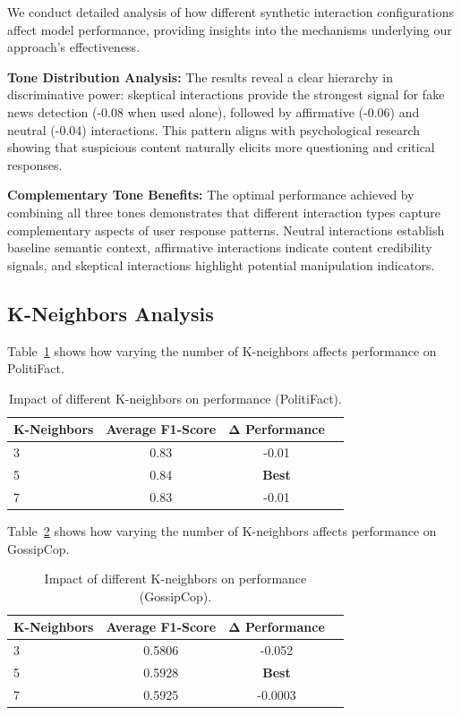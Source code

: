 We conduct detailed analysis of how different synthetic interaction configurations affect model performance, providing insights into the mechanisms underlying our approach's effectiveness.

\textbf{Tone Distribution Analysis:} The results reveal a clear hierarchy in discriminative power: skeptical interactions provide the strongest signal for fake news detection (-0.08 when used alone), followed by affirmative (-0.06) and neutral (-0.04) interactions. This pattern aligns with psychological research showing that suspicious content naturally elicits more questioning and critical responses.

\textbf{Complementary Tone Benefits:} The optimal performance achieved by combining all three tones demonstrates that different interaction types capture complementary aspects of user response patterns. Neutral interactions establish baseline semantic context, affirmative interactions indicate content credibility signals, and skeptical interactions highlight potential manipulation indicators.


\subsection{K-Neighbors Analysis}

Table~\ref{tab:hyperparameter_k_neighbors_politifact} shows how varying the number of K-neighbors affects performance on PolitiFact.

\begin{table}[htbp]
\centering
\caption{Impact of different K-neighbors on performance (PolitiFact).}
\label{tab:hyperparameter_k_neighbors_politifact}
\begin{tabular}{lccc}
\toprule
\textbf{K-Neighbors} & \textbf{Average F1-Score} & \textbf{Δ Performance} \\
\midrule
3 & 0.83 & -0.01 \\
5 & 0.84 & \textbf{Best} \\
7 & 0.83 & -0.01 \\
\bottomrule
\end{tabular}
\end{table}


Table~\ref{tab:hyperparameter_k_neighbors_gossipcop} shows how varying the number of K-neighbors affects performance on GossipCop.

\begin{table}[htbp]
\centering
\caption{Impact of different K-neighbors on performance (GossipCop).}
\label{tab:hyperparameter_k_neighbors_gossipcop}
\begin{tabular}{lccc}
\toprule
\textbf{K-Neighbors} & \textbf{Average F1-Score} & \textbf{Δ Performance} \\
\midrule
3 & 0.5806 & -0.052 \\
5 & 0.5928 & \textbf{Best} \\
7 & 0.5925 & -0.0003 \\
\bottomrule
\end{tabular}
\end{table}

